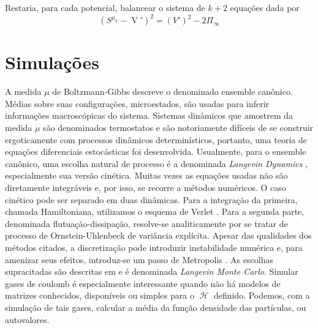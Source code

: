\documentclass[11pt,twocolumn]{article}
\DeclareMathOperator{\Df}{D}
\DeclareMathOperator{\Hf}{\mathcal{H}}
\DeclareMathOperator{\Qf}{Q}
\DeclareMathOperator{\V}{V}
\numberwithin{equation}{section} %
\begin{document}
Restaria, para cada potencial, balancear o sistema de $k+2$ equações dada por
\[
\left( S^{\mu_{V}} - \V' \right)^2 = \left( V' \right)^2 - 2 \Pi_{\infty}
\]

\section{Simulações}
A medida $\mu$ de Boltzmann-Gibbs descreve o denominado ensemble canônico. Médias sobre suas configurações, microestados, são usadas para inferir informações macroscópicas do sistema. Sistemas dinâmicos que amostrem da medida $\mu$ são denominados termostatos e são notoriamente difíceis de se construir ergoticamente com processos dinâmicos determinísticos, portanto, uma teoria de equações diferenciais estocásticas foi desenvolvida. Usualmente, para o ensemble canônico, uma escolha natural de processo é a denominada \textit{Langevin Dynamics} \cite[Capítulo~6]{leimmolecular}, especialmente sua versão cinética. Muitas vezes as equações usadas não são diretamente integráveis e, por isso, se recorre a métodos numéricos. O caso cinético pode ser separado em duas dinâmicas. Para a integração da primeira, chamada Hamiltoniana, utilizamos o esquema de Verlet \cite{Verlet}. Para a segunda parte, denominada flutuação-dissipação, resolve-se analiticamente por se tratar de processo de Ornstein-Uhlenbeck de variância explícita. Apesar das qualidades dos métodos citados, a discretização pode introduzir instabilidade numérica e, para amenizar seus efeitos, introduz-se um passo de Metropolis \cite[Apêndice~C]{leimmolecular}. As escolhas supracitadas são descritas em \cite{Chafa2018} e é denominada \textit{Langevin Monte Carlo}. Simular gases de coulomb é especialmente interessante quando não há modelos de matrizes conhecidos, disponíveis ou simples para o $\Hf$ definido. Podemos, com a simulação de tais gases, calcular a média da função densidade das partículas, ou autovalores.
\end{document}
